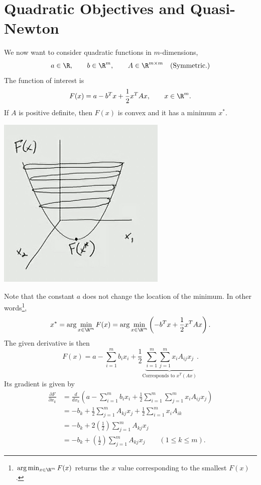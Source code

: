 \documentclass[letterpaper]{article}
\begin{document}
\section{Quadratic Objectives and Quasi-Newton}
We now want to consider quadratic functions in $m$-dimensions, 
\[a \in \R, \qquad b \in \R^m, \qquad A \in \R^{m \times m} \quad \text{(Symmetric.)}\]
The function of interest is 
\[F(x) = a - b^T x + \frac{1}{2}x^T A x, \qquad x \in \R^m.\]
If $A$ is positive definite, then $F(x)$ is convex and it has a minimum $x^*$. 
\begin{center}
    \includegraphics[scale=0.9]{../assets/convex_func.png}
\end{center}
Note that the constant $a$ does not change the location of the minimum. In other words\footnote{$\arg\min_{x \in \R^m} F(x)$ returns the $x$ value corresponding to the smallest $F(x)$.}, \[x^* = \arg \min_{x \in \R^m} F(x) = \arg \min_{x \in \R^m} \left(-b^T x + \frac{1}{2} x^T A x\right).\]
The given derivative is then 
\[F(x) = a - \sum_{i = 1}^{m} b_{i} x_{i} + \frac{1}{2} \underbrace{\sum_{i = 1}^{m} \sum_{j = 1}^{m} x_i A_{ij} x_j}_{\text{Corresponds to } x^T (Ax)}.\]
Its gradient is given by 
\begin{equation*}
    \begin{aligned}
        \frac{\partial F}{\partial x_k} &= \frac{d}{dx_k} \left(a - \sum_{i = 1}^{m} b_{i} x_{i} + \frac{1}{2} \sum_{i = 1}^{m} \sum_{j = 1}^{m} x_i A_{ij} x_j\right) \\ 
            &= -b_{k} + \frac{1}{2} \sum_{j = 1}^{m} A_{kj} x_{j} + \frac{1}{2} \sum_{i = 1}^{m} x_i A_{ik} \\ 
            &= -b_k + 2\left(\frac{1}{2}\right) \sum_{j = 1}^{m} A_{kj} x_j \\ 
            &= -b_k + \left(\frac{1}{2}\right) \sum_{j = 1}^{m} A_{kj} x_j \qquad (1 \leq k \leq m).
    \end{aligned}
\end{equation*}
\end{document}
